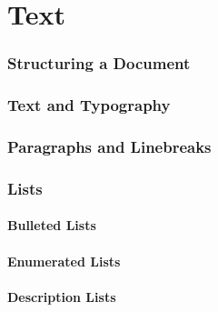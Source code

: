 \part{Text}
\section{Structuring a Document}
% 

\section{Text and Typography}

\section{Paragraphs and Linebreaks}

\section{Lists}

\subsection{Bulleted Lists}

\subsection{Enumerated Lists}

\subsection{Description Lists}

